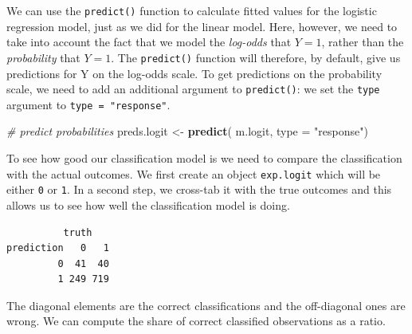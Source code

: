 \documentclass[]{article}
\newenvironment{Shaded}{\begin{snugshade}}{\end{snugshade}}
\newcommand{\CommentTok}[1]{\textcolor[rgb]{0.56,0.35,0.01}{\textit{#1}}}
\newcommand{\DataTypeTok}[1]{\textcolor[rgb]{0.13,0.29,0.53}{#1}}
\newcommand{\DecValTok}[1]{\textcolor[rgb]{0.00,0.00,0.81}{#1}}
\newcommand{\FloatTok}[1]{\textcolor[rgb]{0.00,0.00,0.81}{#1}}
\newcommand{\KeywordTok}[1]{\textcolor[rgb]{0.13,0.29,0.53}{\textbf{#1}}}
\newcommand{\NormalTok}[1]{#1}
\newcommand{\OperatorTok}[1]{\textcolor[rgb]{0.81,0.36,0.00}{\textbf{#1}}}
\newcommand{\StringTok}[1]{\textcolor[rgb]{0.31,0.60,0.02}{#1}}
\begin{document}
We can use the \texttt{predict()} function to calculate fitted values for the logistic regression model, just as we did for the linear model. Here, however, we need to take into account the fact that we model the \emph{log-odds} that \(Y = 1\), rather than the \emph{probability} that \(Y=1\). The \texttt{predict()} function will therefore, by default, give us predictions for Y on the log-odds scale. To get predictions on the probability scale, we need to add an additional argument to \texttt{predict()}: we set the \texttt{type} argument to \texttt{type\ =\ "response"}.

\begin{Shaded}
\begin{Highlighting}[]
\CommentTok{# predict probabilities}
\NormalTok{preds.logit <-}\StringTok{ }\KeywordTok{predict}\NormalTok{( m.logit, }\DataTypeTok{type =} \StringTok{"response"}\NormalTok{)}
\end{Highlighting}
\end{Shaded}

To see how good our classification model is we need to compare the classification with the actual outcomes. We first create an object \texttt{exp.logit} which will be either \texttt{0} or \texttt{1}. In a second step, we cross-tab it with the true outcomes and this allows us to see how well the classification model is doing.

\begin{Shaded}
\end{Shaded}

\begin{verbatim}
          truth
prediction   0   1
         0  41  40
         1 249 719
\end{verbatim}

The diagonal elements are the correct classifications and the off-diagonal ones are wrong. We can compute the share of correct classified observations as a ratio.
\end{document}

